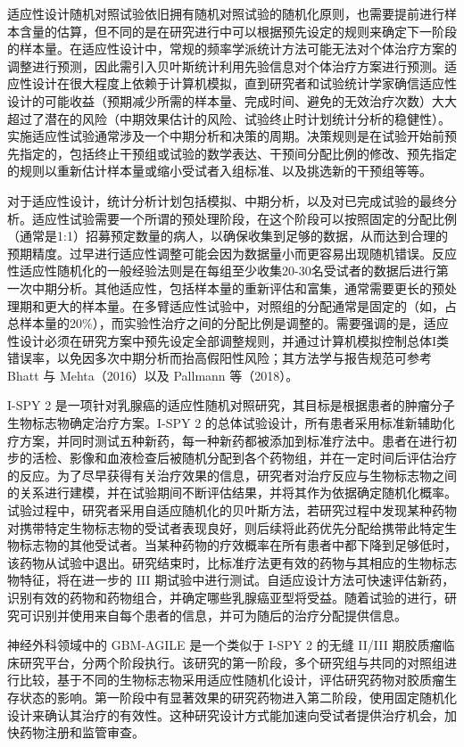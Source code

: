 \documentclass[
  chinese-hans,
  letterpaper,
  DIV=11,
  numbers=noendperiod]{scrreprt}
\begin{document}
适应性设计随机对照试验依旧拥有随机对照试验的随机化原则，也需要提前进行样本含量的估算，但不同的是在研究进行中可以根据预先设定的规则来确定下一阶段的样本量。在适应性设计中，常规的频率学派统计方法可能无法对个体治疗方案的调整进行预测，因此需引入贝叶斯统计利用先验信息对个体治疗方案进行预测。适应性设计在很大程度上依赖于计算机模拟，直到研究者和试验统计学家确信适应性设计的可能收益（预期减少所需的样本量、完成时间、避免的无效治疗次数）大大超过了潜在的风险（中期效果估计的风险、试验终止时计划统计分析的稳健性）。实施适应性试验通常涉及一个中期分析和决策的周期。决策规则是在试验开始前预先指定的，包括终止干预组或试验的数学表达、干预间分配比例的修改、预先指定的规则以重新估计样本量或缩小受试者入组标准、以及挑选新的干预组等等。

对于适应性设计，统计分析计划包括模拟、中期分析，以及对已完成试验的最终分析。适应性试验需要一个所谓的预处理阶段，在这个阶段可以按照固定的分配比例（通常是1:1）招募预定数量的病人，以确保收集到足够的数据，从而达到合理的预期精度。过早进行适应性调整可能会因为数据量小而更容易出现随机错误。反应性适应性随机化的一般经验法则是在每组至少收集20-30名受试者的数据后进行第一次中期分析。其他适应性，包括样本量的重新评估和富集，通常需要更长的预处理期和更大的样本量。在多臂适应性试验中，对照组的分配通常是固定的（如，占总样本量的20\%），而实验性治疗之间的分配比例是调整的。需要强调的是，适应性设计必须在研究方案中预先设定全部调整规则，并通过计算机模拟控制总体I类错误率，以免因多次中期分析而抬高假阳性风险；其方法学与报告规范可参考
Bhatt 与 Mehta（2016）以及 Pallmann 等（2018）。

I-SPY 2
是一项针对乳腺癌的适应性随机对照研究，其目标是根据患者的肿瘤分子生物标志物确定治疗方案。I-SPY
2
的总体试验设计，所有患者采用标准新辅助化疗方案，并同时测试五种新药，每一种新药都被添加到标准疗法中。患者在进行初步的活检、影像和血液检查后被随机分配到各个药物组，并在一定时间后评估治疗的反应。为了尽早获得有关治疗效果的信息，研究者对治疗反应与生物标志物之间的关系进行建模，并在试验期间不断评估结果，并将其作为依据确定随机化概率。试验过程中，研究者采用自适应随机化的贝叶斯方法，若研究过程中发现某种药物对携带特定生物标志物的受试者表现良好，则后续将此药优先分配给携带此特定生物标志物的其他受试者。当某种药物的疗效概率在所有患者中都下降到足够低时，该药物从试验中退出。研究结束时，比标准疗法更有效的药物与其相应的生物标志物特征，将在进一步的
III
期试验中进行测试。自适应设计方法可快速评估新药，识别有效的药物和药物组合，并确定哪些乳腺癌亚型将受益。随着试验的进行，研究可识别并使用来自每个患者的信息，并可为随后的治疗分配提供信息。

神经外科领域中的 GBM-AGILE 是一个类似于 I-SPY 2 的无缝 II/III
期胶质瘤临床研究平台，分两个阶段执行。该研究的第一阶段，多个研究组与共同的对照组进行比较，基于不同的生物标志物采用适应性随机化设计，评估研究药物对胶质瘤生存状态的影响。第一阶段中有显著效果的研究药物进入第二阶段，使用固定随机化设计来确认其治疗的有效性。这种研究设计方式能加速向受试者提供治疗机会，加快药物注册和监管审查。
\end{document}
